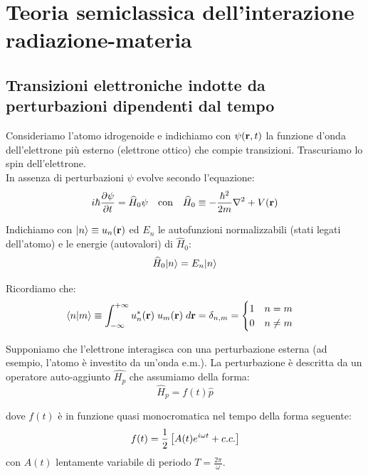 \chapter{Teoria semiclassica dell'interazione radiazione-materia}
\graphicspath{{./cap_2/images/}}

\section{Transizioni elettroniche indotte da perturbazioni dipendenti dal tempo}
Consideriamo l'atomo idrogenoide e indichiamo con $\psi(\mathbf{r},t)$ la funzione d'onda dell'elettrone più esterno (elettrone ottico) che compie transizioni. Trascuriamo lo spin dell'elettrone.\\
In assenza di perturbazioni $\psi$ evolve secondo l'equazione:
\begin{equation*}
    i\hbar \frac{\partial \psi}{\partial t} = \widehat{H}_0 \psi \quad \text{con} \quad \widehat{H}_0 \equiv -\frac{\hbar^2}{2m} \nabla^2 + V(\mathbf{r})
\end{equation*}

Indichiamo con $|n\rangle \equiv u_n(\mathbf{r})$ ed $E_n$ le autofunzioni normalizzabili (stati legati dell'atomo) e le energie (autovalori) di $\widehat{H}_0$:
\begin{equation}\label{eq: eq auto non perturbata}
    \widehat{H}_0 |n\rangle = E_n |n\rangle
\end{equation}

Ricordiamo che:
\begin{equation*}
    \langle n | m \rangle \equiv \int_{-\infty}^{+\infty} u_n^*(\mathbf{r}) \; u_m(\mathbf{r}) \; d\mathbf{r} = \delta_{n,m} = \begin{cases}
        1\quad n = m\\
        0 \quad n \neq m
    \end{cases}
\end{equation*}

Supponiamo che l'elettrone interagisca con una perturbazione esterna (ad esempio, l'atomo è investito da un'onda e.m.). La perturbazione è descritta da un operatore auto-aggiunto $\hat{H_p}$ che assumiamo della forma:
\begin{equation}\label{eq: ham perturbata}
    \widehat{H}_p = f(t) \widehat{p}
\end{equation}

dove $f(t)$ è in funzione quasi monocromatica nel tempo della forma seguente:
\begin{equation*}
    f(t) = \frac{1}{2} \left[ A(t) e^{i\omega t} + c.c. \right]
\end{equation*}
con $A(t)$ lentamente variabile di periodo $T =  \frac{2\pi}{\omega}$.

